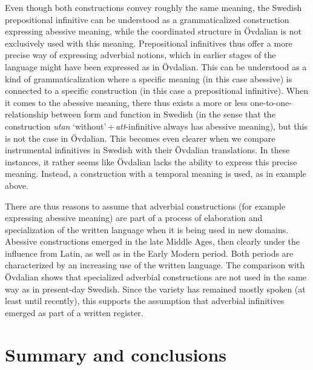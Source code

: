 \documentclass[output=paper]{langscibook}
\begin{document}
Even though both constructions convey roughly the same meaning, the Swedish prepositional infinitive can be understood as a grammaticalized construction expressing abessive meaning, while the coordinated structure in Övdalian is not exclusively used with this meaning. Prepositional infinitives thus offer a more precise way of expressing adverbial notions, which in earlier stages of the language might have been expressed as in Övdalian. This can be understood as a kind of grammaticalization where a specific meaning (in this case abessive) is connected to a specific construction (in this case a prepositional infinitive). When it comes to the abessive meaning, there thus exists a more or less one-to-one-relationship between form and function in Swedish (in the sense that the construction \textit{utan} ‘without’\,+\,\textit{att}-infinitive always has abessive meaning), but this is not the case in Övdalian. This becomes even clearer when we compare instrumental infinitives in Swedish with their Övdalian translations. In these instances, it rather seems like Övdalian lacks the ability to express this precise meaning. Instead, a construction with a temporal meaning is used, as in example  above. 



There are thus reasons to assume that adverbial constructions (for example expressing abessive meaning) are part of a process of elaboration and specialization of the written language when it is being used in new domains. Abessive constructions emerged in the late Middle Ages, then clearly under the influence from Latin, as well as in the Early Modern period. Both periods are characterized by an increasing use of the written language. The comparison with Övdalian shows that specialized adverbial constructions are not used in the same way as in present-day Swedish. Since the variety has remained mostly spoken (at least until recently), this supports the assumption that adverbial infinitives emerged as part of a written register.  


\section{Summary and conclusions}\label{sec:kalm:6}
\end{document}
